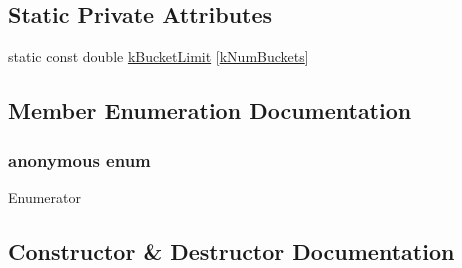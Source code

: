 \subsection*{Static Private Attributes}
\begin{DoxyCompactItemize}
\item 
static const double \hyperlink{classleveldb_1_1_histogram_aaad18e83be993ecfe63a566869a9d3cc}{k\+Bucket\+Limit} \mbox{[}\hyperlink{classleveldb_1_1_histogram_a85ac6d5944226d81702ae69147996ec8a6ea13d53f7e3910a6b7c293d48d0a0da}{k\+Num\+Buckets}\mbox{]}
\end{DoxyCompactItemize}


\subsection{Member Enumeration Documentation}
\hypertarget{classleveldb_1_1_histogram_a85ac6d5944226d81702ae69147996ec8}{}\subsubsection[{anonymous enum}]{\setlength{\rightskip}{0pt plus 5cm}anonymous enum\hspace{0.3cm}{\ttfamily [private]}}\label{classleveldb_1_1_histogram_a85ac6d5944226d81702ae69147996ec8}
\begin{Desc}
\item[Enumerator]\par
\begin{description}
\item[{\em 
\hypertarget{classleveldb_1_1_histogram_a85ac6d5944226d81702ae69147996ec8a6ea13d53f7e3910a6b7c293d48d0a0da}{}k\+Num\+Buckets\label{classleveldb_1_1_histogram_a85ac6d5944226d81702ae69147996ec8a6ea13d53f7e3910a6b7c293d48d0a0da}
}]\end{description}
\end{Desc}


\subsection{Constructor \& Destructor Documentation}
\hypertarget{classleveldb_1_1_histogram_a2b4d29303598913c7021d077e5a8b10f}{}
